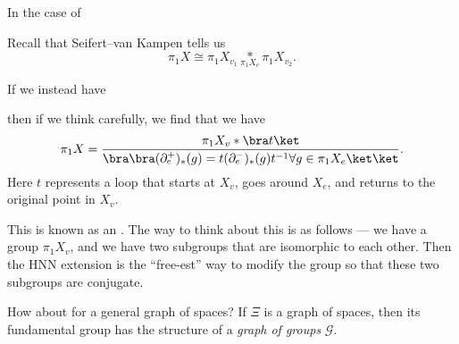 \documentclass[a4paper]{article}
\begin{document}
\begin{eg}
  In the case of
  \begin{center}
  \end{center}
  Recall that Seifert--van Kampen tells us
  \[
    \pi_1 X \cong \pi_1 X_{v_1} \underset{\pi_1 X_e}{*} \pi_1 X_{v_2}.
  \]
\end{eg}

\begin{eg}
  If we instead have


  then if we think carefully, we find that we have
  \[
    \pi_1 X = \frac{\pi_1 X_v * \bra t\ket}{\bra \bra(\partial_e^+)_*(g) = t (\partial_e^-)_*(g) t^{-1} \forall g \in \pi_1 X_e\ket \ket}.
  \]
  Here $t$ represents a loop that starts at $X_v$, goes around $X_e$, and returns to the original point in $X_v$.

  This is known as an . The way to think about this is as follows --- we have a group $\pi_1 X_v$, and we have two subgroups that are isomorphic to each other. Then the HNN extension is the ``free-est'' way to modify the group so that these two subgroups are conjugate.
\end{eg}

How about for a general graph of spaces? If $\Xi$ is a graph of spaces, then its fundamental group has the structure of a \emph{graph of groups} $\mathcal{G}$.
\end{document}
